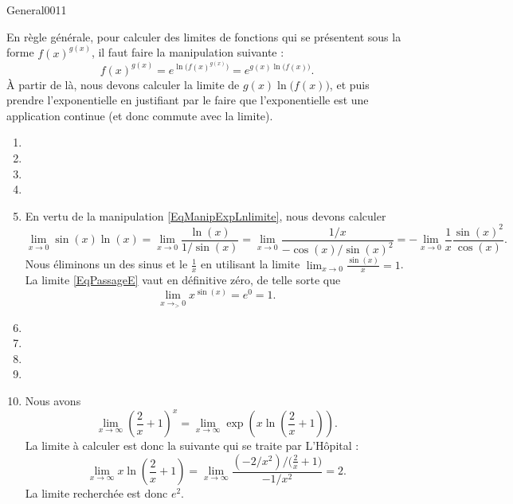 \begin{corrige}{General0011}

En règle générale, pour calculer des limites de fonctions qui se présentent sous la forme $f(x)^{g(x)}$, il faut faire la manipulation suivante :
\begin{equation}	\label{EqManipExpLnlimite}
	f(x)^{g(x)}= e^{\ln\big( f(x)^{g(x)} \big)}= e^{g(x)\ln\big( f(x) \big)}.
\end{equation}
À partir de là, nous devons calculer la limite de $g(x)\ln\big( f(x) \big)$, et puis prendre l'exponentielle en justifiant par le faire que l'exponentielle est une application continue (et donc commute avec la limite).

\begin{enumerate}

\item
\item
\item
\item
\item
En vertu de la manipulation \eqref{EqManipExpLnlimite}, nous devons calculer
\begin{equation}		\label{EqPassageE}
	\lim_{x\to 0} \sin(x)\ln(x)=\lim_{x\to 0} \frac{ \ln(x) }{ 1/\sin(x) }=\lim_{x\to 0} \frac{ 1/x }{ -\cos(x)/\sin(x)^2 }=-\lim_{x\to 0} \frac{1}{ x }\frac{ \sin(x)^2 }{ \cos(x) }.
\end{equation}
Nous éliminons un des sinus et le $\frac{1}{ x }$ en utilisant la limite $\lim_{x\to 0} \frac{ \sin(x) }{ x }=1$. La limite \eqref{EqPassageE} vaut en définitive zéro, de telle sorte que
\begin{equation}
	\lim_{x\to_> 0} x^{\sin(x)}= e^{0}=1.
\end{equation}

\item
\item
\item
\item
\item

Nous avons
\begin{equation}
	\lim_{x\to \infty} \left( \frac{ 2 }{ x }+1 \right)^x=\lim_{x\to \infty} \exp\left( x\ln(\frac{ 2 }{ x }+1) \right).
\end{equation}
La limite à calculer est donc la suivante qui se traite par L'Hôpital :
\begin{equation}
	\lim_{x\to \infty} x\ln\left( \frac{ 2 }{ x }+1 \right)=\lim_{x\to \infty} \frac{  (-2/x^2)/\big( \frac{ 2 }{ x }+1 \big)     }{ -1/x^2 }=2.
\end{equation}
La limite recherchée est donc $e^2$.


\end{enumerate}
\end{corrige}
